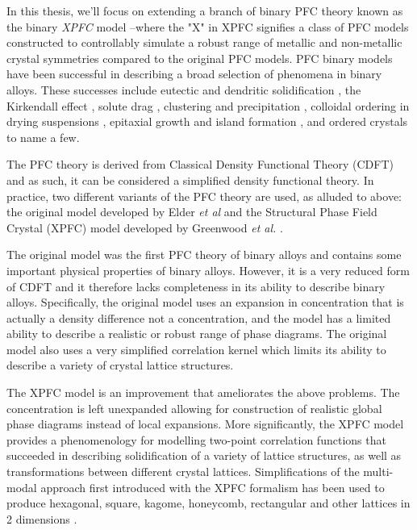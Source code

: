 
In this thesis, we'll focus on extending a branch of binary PFC theory known as
the binary {\it XPFC} model --where the "X" in XPFC signifies a class of PFC
models  constructed to controllably simulate a robust range of metallic and
non-metallic crystal symmetries compared to the original PFC models. PFC binary
models have been successful in describing a broad selection of phenomena in
binary alloys.  These successes include eutectic and dendritic solidification
\cite{ELDER07}, the Kirkendall effect \cite{ELDER11_KIRKENDALL, LU15}, solute
drag \cite{GREENWOOD12}, clustering and precipitation \cite{FALLAH12, FALLAH13,
FALLAH13_AlCu_experiment}, colloidal ordering in drying suspensions
\cite{GANAI13}, epitaxial growth and island formation \cite{ELDER10_NANOISLAND,
LU16}, and ordered crystals \cite{ALSTER17} to name a few. 

The PFC theory is derived from Classical Density Functional Theory (CDFT) and
as such, it can be considered a simplified density functional theory.  In
practice, two different variants of the PFC theory are used, as alluded to
above: the original model developed by Elder \textit{et al} \cite{ELDER07} and
the Structural Phase Field Crystal (XPFC) model developed by Greenwood
\textit{et al.} \cite{GREENWOOD11_BINARY}.

The original model was the first PFC theory of binary alloys and contains some
important physical properties of binary alloys. However, it is a very reduced
form of CDFT and it therefore lacks completeness in its ability to describe
binary alloys. Specifically, the original model uses an expansion in
concentration that is actually a density difference not a concentration, and
the model has a limited ability to describe a realistic or robust range of
phase diagrams. The original model also uses a very simplified correlation
kernel which limits its ability to describe a variety of crystal lattice
structures.

The XPFC model is an improvement that ameliorates the above problems. The
concentration is left unexpanded allowing for construction of realistic global
phase diagrams instead of local expansions. More significantly, the XPFC model
provides a phenomenology for modelling two-point correlation functions that
succeeded in describing solidification of a variety of lattice structures, as
well as transformations between different crystal lattices. Simplifications of
the multi-modal approach first introduced with the XPFC formalism has been used
to produce hexagonal, square, kagome, honeycomb, rectangular and other lattices
in 2 dimensions \cite{MKHONTA13}.

